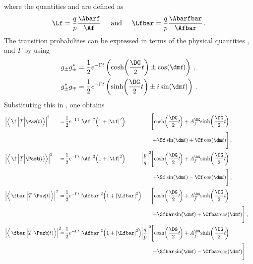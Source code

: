 where the quantities \Lf and \Lfbar are defined as
\begin{equation}
\Lf=\frac{q}{p}\frac{\Abarf}{\Af}\hspace{0.5cm}\text{and}
\hspace{0.5cm}\Lfbar=\frac{q}{p}\frac{\Abarfbar}{\Afbar}\,.\label{eq:defLambdas}
\end{equation}
The transition probabilites can be expressed in terms of the physical quantities \dm, \DG and $\Gamma$ by using
\begin{align}
g_{\pm}g_{\pm}^{*} &= \frac{1}{2}e^{-\Gamma t}\left(\cosh\!\left(\frac{\DG}{2}t\right)\pm\cos\!\left(\dm t\right)\right)\,,\\
g_{\pm}^*g_{\mp} &=  \frac{1}{2}e^{-\Gamma t}\left(\sinh\!\left(\frac{\DG}{2}t\right)\pm i\sin\!\left(\dm t\right)\right)\,.
\end{align}
Substituting this in , one obtains
\begin{align}
&\left|\left<\,\f\,\Big|T\Big|\Paz\!(t)\right>\right|^2\!\!\!\!\!\!\!&=
&\kern 1pt {\frac{1}{2}e^{-\Gamma t}\left|\Af\,\right|^2\!\left(1+\left|\Lf\right|^2\right)}& &&
&\kern -11.0pt{\Bigg[\!\cosh\!\left(\frac{\DG}{2}t\!\right) + A_f^{\DG}\!\sinh\!\left(\frac{\DG}{2}t\!\right)}&\nonumber\\
&& && && &\kern -7.5pt{-\Sf\sin\!\left(\dm t\right)+\Cf\cos\!\left(\dm t\right)\!\Bigg]}\,,&\label{eq:Ptof}\\
&\left|\left<\,\f\,\Big|T\Big|\Pazb\!(t)\right>\right|^2\!\!\!\!\!\!\!&=
&\kern 1pt {\frac{1}{2}e^{-\Gamma t}\left|\Af\,\right|^2\!\left(1+\left|\Lf\right|^2\right)}& &\kern -10.5pt{\left|\frac{p}{q}\right|^2}&
&\kern -11.0pt{\Bigg[\!\cosh\!\left(\frac{\DG}{2}t\!\right) + A_f^{\DG}\!\sinh\!\left(\frac{\DG}{2}t\!\right)}&\nonumber\\
&& && && &\kern -7.5pt{+\Sf\sin\!\left(\dm t\right)-\Cf\cos\!\left(\dm t\right)\!\Bigg]}\,,&\label{eq:Pbartof}\\
&\left|\left<\,\fbar\,\Big|T\Big|\Paz\!(t)\right>\right|^2\!\!\!\!\!\!\!&=
&\kern 1pt {\frac{1}{2}e^{-\Gamma t}\left|\Afbar\right|^2\!\left(1+\left|\Lfbar\right|^2\right)}& &&
&\kern -11.0pt{\Bigg[\!\cosh\!\left(\frac{\DG}{2}t\!\right) + A_{\kern 1.5pt\overline{\kern -1.5pt f\kern 1.5pt}}^{\DG}\!\sinh\!\left(\frac{\DG}{2}t\!\right)}&\nonumber\\
&& && && &\kern -7.5pt{-\Sfbar\kern -0.1em\sin\!\left(\dm t\right)+\Cfbar\kern -0.1em\cos\!\left(\dm t\right)\!\Bigg]}\,,&\label{eq:Ptofbar}\\
&\left|\left<\,\fbar\,\Big|T\Big|\Pazb\!(t)\right>\right|^2\!\!\!\!\!\!\!&=
&\kern 1pt {\frac{1}{2}e^{-\Gamma t}\left|\Afbar\right|^2\!\left(1+\left|\Lfbar\right|^2\right)}& &\kern -10.5pt{\left|\frac{q}{p}\right|^2}&
&\kern -11.0pt{\Bigg[\!\cosh\!\left(\frac{\DG}{2}t\!\right) + A_{\kern 1.5pt\overline{\kern -1.5pt f\kern 1.5pt}}^{\DG}\!\sinh\!\left(\frac{\DG}{2}t\!\right)}&\nonumber\\
&& && && &\kern -7.5pt{+\Sfbar\kern -0.1em \sin\!\left(\dm t\right)-\Cfbar\kern -0.1em\cos\!\left(\dm t\right)\!\Bigg]}&\label{eq:Pbartofbar}
\end{align}
